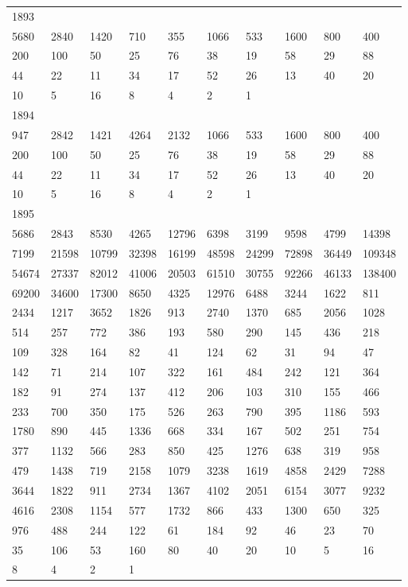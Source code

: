 \begin{longtable}{*{10}{l}}
1893&&&&&&&&&\\
5680& 2840& 1420& 710& 355& 1066& 533& 1600& 800& 400\\
200& 100& 50& 25& 76& 38& 19& 58& 29& 88\\
44& 22& 11& 34& 17& 52& 26& 13& 40& 20\\
10& 5& 16& 8& 4& 2& 1& \\

1894&&&&&&&&&\\
947& 2842& 1421& 4264& 2132& 1066& 533& 1600& 800& 400\\
200& 100& 50& 25& 76& 38& 19& 58& 29& 88\\
44& 22& 11& 34& 17& 52& 26& 13& 40& 20\\
10& 5& 16& 8& 4& 2& 1& \\

1895&&&&&&&&&\\
5686& 2843& 8530& 4265& 12796& 6398& 3199& 9598& 4799& 14398\\
7199& 21598& 10799& 32398& 16199& 48598& 24299& 72898& 36449& 109348\\
54674& 27337& 82012& 41006& 20503& 61510& 30755& 92266& 46133& 138400\\
69200& 34600& 17300& 8650& 4325& 12976& 6488& 3244& 1622& 811\\
2434& 1217& 3652& 1826& 913& 2740& 1370& 685& 2056& 1028\\
514& 257& 772& 386& 193& 580& 290& 145& 436& 218\\
109& 328& 164& 82& 41& 124& 62& 31& 94& 47\\
142& 71& 214& 107& 322& 161& 484& 242& 121& 364\\
182& 91& 274& 137& 412& 206& 103& 310& 155& 466\\
233& 700& 350& 175& 526& 263& 790& 395& 1186& 593\\
1780& 890& 445& 1336& 668& 334& 167& 502& 251& 754\\
377& 1132& 566& 283& 850& 425& 1276& 638& 319& 958\\
479& 1438& 719& 2158& 1079& 3238& 1619& 4858& 2429& 7288\\
3644& 1822& 911& 2734& 1367& 4102& 2051& 6154& 3077& 9232\\
4616& 2308& 1154& 577& 1732& 866& 433& 1300& 650& 325\\
976& 488& 244& 122& 61& 184& 92& 46& 23& 70\\
35& 106& 53& 160& 80& 40& 20& 10& 5& 16\\
8& 4& 2& 1& \\


\end{longtable}
